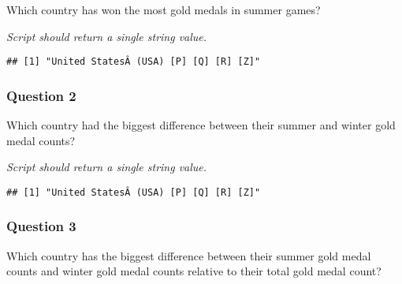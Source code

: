 \documentclass[
]{article}
\newenvironment{Shaded}{\begin{snugshade}}{\end{snugshade}}
\newcommand{\DataTypeTok}[1]{\textcolor[rgb]{0.13,0.29,0.53}{#1}}
\newcommand{\DecValTok}[1]{\textcolor[rgb]{0.00,0.00,0.81}{#1}}
\newcommand{\FloatTok}[1]{\textcolor[rgb]{0.00,0.00,0.81}{#1}}
\newcommand{\KeywordTok}[1]{\textcolor[rgb]{0.13,0.29,0.53}{\textbf{#1}}}
\newcommand{\NormalTok}[1]{#1}
\newcommand{\OperatorTok}[1]{\textcolor[rgb]{0.81,0.36,0.00}{\textbf{#1}}}
\newcommand{\StringTok}[1]{\textcolor[rgb]{0.31,0.60,0.02}{#1}}
\begin{document}
Which country has won the most gold medals in summer games?

\emph{Script should return a single string value.}

\begin{Shaded}
\end{Shaded}

\begin{verbatim}
## [1] "United StatesÂ (USA) [P] [Q] [R] [Z]"
\end{verbatim}

\hypertarget{question-2}{%
\subsubsection{Question 2}\label{question-2}}

Which country had the biggest difference between their summer and winter
gold medal counts?

\emph{Script should return a single string value.}

\begin{Shaded}
\end{Shaded}

\begin{verbatim}
## [1] "United StatesÂ (USA) [P] [Q] [R] [Z]"
\end{verbatim}

\hypertarget{question-3}{%
\subsubsection{Question 3}\label{question-3}}

Which country has the biggest difference between their summer gold medal
counts and winter gold medal counts relative to their total gold medal
count?
\end{document}
